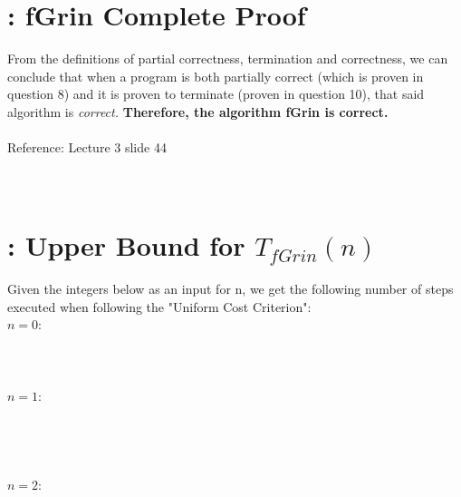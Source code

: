\documentclass{article}
\begin{document}
    \section{: fGrin Complete Proof}
    From the definitions of partial correctness, termination and correctness, we can conclude that when a program is both partially correct (which is proven in question 8) and it is proven to terminate (proven in question 10), that said algorithm is \textit{correct.} \textbf{Therefore, the algorithm fGrin is correct.}\\
    \\Reference:  Lecture 3 slide 44
    \\
    \\
    \\
    \section{: Upper Bound for $T_{fGrin}(n)$ }
    Given the integers below as an input for n, we get the following number of steps executed when following the "Uniform Cost Criterion":
    \\\indent$n=0$:
    \\\indent\indent{}
    \\\indent\indent\indent{}
    \\\indent\indent\indent{}
    \\\indent$n=1$:
    \\\indent\indent{}
    \\\indent\indent\indent{}
    \\\indent\indent\indent{}
    \\\indent\indent\indent{}
    \\\indent$n=2$:
    \\\indent\indent{}
    \\\indent\indent\indent{}
    \\\indent\indent\indent{}
    \\\indent\indent\indent{}
    \\\indent\indent\indent{}
\end{document}

